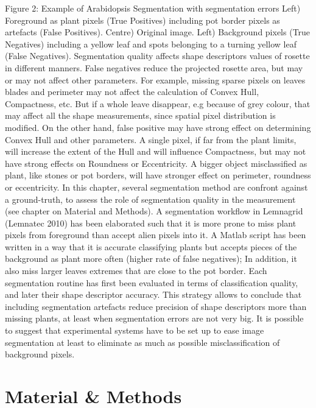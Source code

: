 \documentclass{frontiersSCNS} %
\begin{document}
Figure 2: Example of Arabidopsis Segmentation with segmentation errors Left) Foreground as plant pixels (True Positives) including pot border pixels as artefacts (False Positives). Centre) Original image. Left) Background pixels (True Negatives) including a yellow leaf and spots belonging to a turning yellow leaf (False Negatives).
Segmentation quality affects shape descriptors values of rosette in different manners. False negatives reduce the projected rosette area, but may or may not affect other parameters. For example, missing sparse pixels on leaves blades and perimeter may not affect the calculation of Convex Hull, Compactness, etc. But if a whole leave disappear, e.g because of grey colour, that may affect all the shape measurements, since spatial pixel distribution is modified. On the other hand, false positive may have strong effect on determining Convex Hull and other parameters. A single pixel, if far from the plant limits, will increase the extent of the Hull and will influence Compactness, but may not have strong effects on Roundness or Eccentricity. A bigger object misclassified as plant, like stones or pot borders, will have stronger effect on perimeter, roundness or eccentricity.
In this chapter, several segmentation method are confront against a ground-truth, to assess the role of segmentation quality in the measurement (see chapter on Material and Methods). A segmentation workflow in Lemnagrid (Lemnatec 2010) has been elaborated such that it is more prone to miss plant pixels from foreground than accept alien pixels into it. A Matlab script has been written in a way that it is accurate classifying plants but accepts pieces of the background as plant more often (higher rate of false negatives); In addition, it also miss larger leaves extremes that are close to the pot border.
Each segmentation routine has first been evaluated in terms of classification quality, and later their shape descriptor accuracy. This strategy allows to conclude that including segmentation artefacts reduce precision of shape descriptors more than missing plants, at least when segmentation errors are not very big. It is possible to suggest that experimental systems have to be set up to ease image segmentation at least to eliminate as much as possible misclassification of background pixels.




\section{Material \& Methods}
\end{document}
